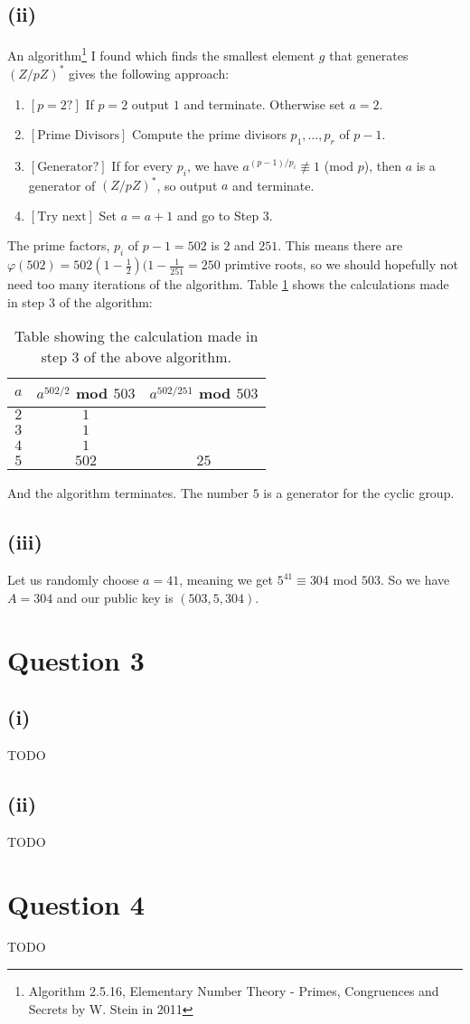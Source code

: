 \documentclass[a4paper, fleqn]{article}
\begin{document}
\subsection{(ii)}
An algorithm\footnote{Algorithm 2.5.16, Elementary Number Theory - Primes, Congruences and Secrets by W. Stein in 2011} I found which finds the smallest element $g$ that generates $(Z/pZ)^*$ gives the following approach:
\begin{enumerate}
  \item  $[p = 2?]$ If $p=2$ output $1$ and terminate. Otherwise set $a=2$.
  \item  $[\mbox{Prime Divisors}]$ Compute the prime divisors $p_1,\ldots, p_r$ of $p-1$.
  \item  $[\mbox{Generator?}]$ If for every $p_i$, we have $a^{(p-1)/p_i} \not\equiv 1$ (mod $p$), then $a$ is a generator of $(Z/pZ)^*$, so output $a$ and terminate.
  \item  $[\mbox{Try next}]$ Set $a=a+1$ and go to Step 3.
\end{enumerate}
The prime factors, $p_i$ of $p-1=502$ is $2$ and $251$. This means there are $\varphi(502)=502(1-\frac{1}{2})(1-\frac{1}{251}=250$ primtive roots, so we should hopefully not need too many iterations of the algorithm. Table \ref{tab1} shows the calculations made in step $3$ of the algorithm:
\begin{table}
  \centering
  \begin{tabular}{|c|c|c|}
  \hline
  $a$ & $a^{502/2}$ mod $503$ & $a^{502/251}$ mod $503$ \\
  \hline
  $2$ & $1$ & \\
  \hline
  $3$ & $1$ & \\
  \hline
  $4$ & $1$ & \\
  \hline
  $5$ & $502$ & $25$ \\
  \hline
  \end{tabular}
  \caption{Table showing the calculation made in step $3$ of the above algorithm.}
  \label{tab1}
\end{table}
And the algorithm terminates. The number $5$ is a generator for the cyclic group.

\subsection{(iii)}
Let us randomly choose $a=41$, meaning we get $5^{41} \equiv 304$ mod $503$. So we have $A=304$ and our public key is $(503, 5, 304)$.

\section{Question 3}

\subsection{(i)}
TODO

\subsection{(ii)}
TODO

\section{Question 4}
TODO
\end{document}
